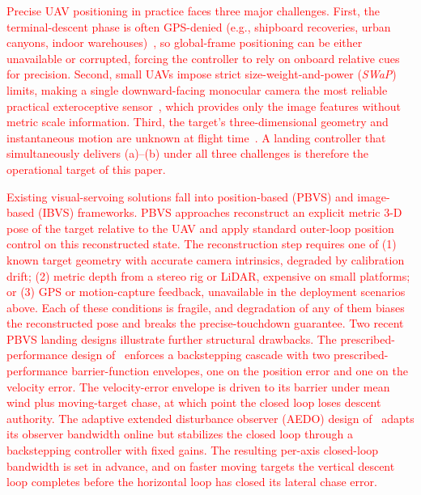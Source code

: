 \documentclass{IEEEtaes}
\newcommand{\new}[1]{\textcolor{red}{#1}}
\begin{document}
\new{Precise UAV positioning in practice faces three major challenges. First, the terminal-descent phase is often {GPS-denied} (e.g., shipboard recoveries, urban canyons, indoor warehouses)~\cite{xie2016}, so global-frame positioning can be either unavailable or corrupted, forcing the controller to rely on onboard relative cues for precision. Second, small UAVs impose strict size-weight-and-power (\emph{SWaP}) limits, making a single downward-facing monocular camera the most reliable practical exteroceptive sensor~\cite{chaumette2006, herisse2012}, which provides only the image features without metric scale information. Third, the target's three-dimensional geometry and instantaneous motion are unknown at flight time~\cite{chen2025, bouazza2025}. A landing controller that simultaneously delivers (a)--(b) under all three challenges is therefore the operational target of this paper.}

\new{Existing visual-servoing solutions fall into position-based (PBVS) and image-based (IBVS) frameworks. PBVS approaches reconstruct an explicit metric 3-D pose of the target relative to the UAV and apply standard outer-loop position control on this reconstructed state. The reconstruction step requires one of (1) known target geometry with accurate camera intrinsics, degraded by calibration drift; (2) metric depth from a stereo rig or LiDAR, expensive on small platforms; or (3) GPS or motion-capture feedback, unavailable in the deployment scenarios above. Each of these conditions is fragile, and degradation of any of them biases the reconstructed pose and breaks the precise-touchdown guarantee. Two recent PBVS landing designs illustrate further structural drawbacks. The prescribed-performance design of~\cite{lin2022} enforces a backstepping cascade with two prescribed-performance barrier-function envelopes, one on the position error and one on the velocity error. The velocity-error envelope is driven to its barrier under mean wind plus moving-target chase, at which point the closed loop loses descent authority. The adaptive extended disturbance observer (AEDO) design of~\cite{zhang2026} adapts its observer bandwidth online but stabilizes the closed loop through a backstepping controller with fixed gains. The resulting per-axis closed-loop bandwidth is set in advance, and on faster moving targets the vertical descent loop completes before the horizontal loop has closed its lateral chase error.}
\end{document}
